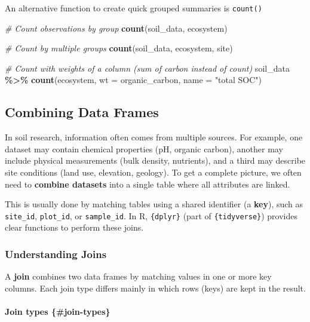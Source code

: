 \documentclass[
  10pt,
  b5paper,
  oneside]{book}
\newenvironment{Shaded}{\begin{snugshade}}{\end{snugshade}}
\newcommand{\AttributeTok}[1]{\textcolor[rgb]{0.13,0.29,0.53}{#1}}
\newcommand{\CommentTok}[1]{\textcolor[rgb]{0.56,0.35,0.01}{\textit{#1}}}
\newcommand{\FunctionTok}[1]{\textcolor[rgb]{0.13,0.29,0.53}{\textbf{#1}}}
\newcommand{\NormalTok}[1]{#1}
\newcommand{\SpecialCharTok}[1]{\textcolor[rgb]{0.81,0.36,0.00}{\textbf{#1}}}
\newcommand{\StringTok}[1]{\textcolor[rgb]{0.31,0.60,0.02}{#1}}
\begin{document}
An alternative function to create quick grouped summaries is \texttt{count()}

\begin{Shaded}
\begin{Highlighting}[]
\CommentTok{\# Count observations by group}
\FunctionTok{count}\NormalTok{(soil\_data, ecosystem)}

\CommentTok{\# Count by multiple groups}
\FunctionTok{count}\NormalTok{(soil\_data, ecosystem, site)}

\CommentTok{\# Count with weights of a column (sum of carbon instead of count)}
\NormalTok{soil\_data }\SpecialCharTok{\%\textgreater{}\%}
 \FunctionTok{count}\NormalTok{(ecosystem, }\AttributeTok{wt =}\NormalTok{ organic\_carbon, }\AttributeTok{name =} \StringTok{"total SOC"}\NormalTok{)}
\end{Highlighting}
\end{Shaded}

\subsection{Combining Data Frames}\label{dplyr-join}

In soil research, information often comes from multiple sources. For example, one dataset may contain chemical properties (pH, organic carbon), another may include physical measurements (bulk density, nutrients), and a third may describe site conditions (land use, elevation, geology). To get a complete picture, we often need to \textbf{combine datasets} into a single table where all attributes are linked.

This is usually done by matching tables using a shared identifier (a \textbf{key}), such as \texttt{site\_id}, \texttt{plot\_id}, or \texttt{sample\_id}. In R, \texttt{\{dplyr\}} (part of \texttt{\{tidyverse\}}) provides clear functions to perform these joins.

\subsubsection{Understanding Joins}\label{understand-joins}

A \textbf{join} combines two data frames by matching values in one or more key columns. Each join type differs mainly in which rows (keys) are kept in the result.

\paragraph*{Join types \{\#join-types\}}\label{join-types-join-types}
\end{document}
